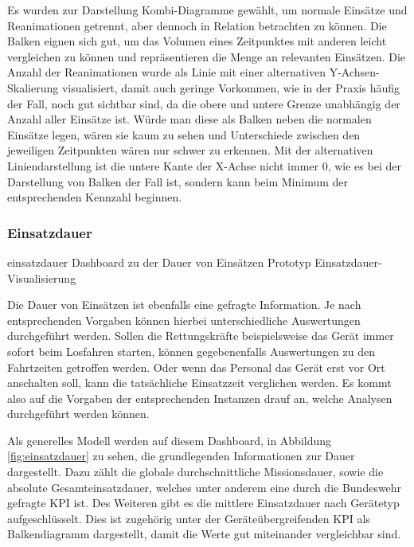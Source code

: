 Es wurden zur Darstellung Kombi-Diagramme gewählt, um normale Einsätze und Reanimationen getrennt, aber dennoch in Relation betrachten zu können.
Die Balken eignen sich gut, um das Volumen eines Zeitpunktes mit anderen leicht vergleichen zu können und repräsentieren die Menge an relevanten Einsätzen.
Die Anzahl der Reanimationen wurde als Linie mit einer alternativen Y-Achsen-Skalierung visualisiert, damit auch geringe Vorkommen, wie in der Praxis häufig der Fall, noch gut sichtbar sind, da die obere und untere Grenze unabhängig der Anzahl aller Einsätze ist.
Würde man diese als Balken neben die normalen Einsätze legen, wären sie kaum zu sehen und Unterschiede zwischen den jeweiligen Zeitpunkten wären nur schwer zu erkennen.
Mit der alternativen Liniendarstellung ist die untere Kante der X-Achse nicht immer 0, wie es bei der Darstellung von Balken der Fall ist, sondern kann beim Minimum der entsprechenden Kennzahl beginnen.

\subsubsection{Einsatzdauer}
\label{subsub:dauer}
\bildbreit
{einsatzdauer}
{Dashboard zu der Dauer von Einsätzen}
{Prototyp Einsatzdauer-Visualisierung}

Die Dauer von Einsätzen ist ebenfalls eine gefragte Information. 
Je nach entsprechenden Vorgaben können hierbei unterschiedliche Auswertungen durchgeführt werden.
Sollen die Rettungskräfte beispielsweise das Gerät immer sofort beim Losfahren starten, können gegebenenfalls Auswertungen zu den Fahrtzeiten getroffen werden.
Oder wenn das Personal das Gerät erst vor Ort anschalten soll, kann die tatsächliche Einsatzzeit verglichen werden.
Es kommt also auf die Vorgaben der entsprechenden Instanzen drauf an, welche Analysen durchgeführt werden können.

Als generelles Modell werden auf diesem Dashboard, in Abbildung \ref{fig:einsatzdauer} zu sehen, die grundlegenden Informationen zur Dauer dargestellt.
Dazu zählt die globale durchschnittliche Missionsdauer, sowie die absolute Gesamteinsatzdauer, welches unter anderem eine durch die Bundeswehr gefragte \gls{KPI} ist.
Des Weiteren gibt es die mittlere Einsatzdauer nach Gerätetyp aufgeschlüsselt. 
Dies ist zugehörig unter der Geräteübergreifenden \gls{KPI} als Balkendiagramm dargestellt, damit die Werte gut miteinander vergleichbar sind.


